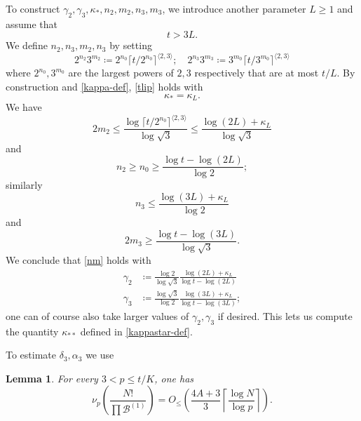 \documentclass[10pt,a4paper,reqno]{amsart}
\numberwithin{equation}{section}
\theoremstyle{plain}
\newtheorem{lemma}[lemma]{Lemma}
\theoremstyle{definition}
\newcommand\tuple{{\mathcal B}}
\begin{document}
To construct $\gamma_2, \gamma_3, \kappa_*, n_2, m_2, n_3, m_3$, we introduce another parameter $L \geq 1$ and assume that
\begin{equation}\label{t-lower}
  t > 3L.
\end{equation}
We define $n_2,n_3,m_2,n_3$ by setting
$$
2^{n_2} 3^{m_2} \coloneqq 2^{n_0} \lceil t/2^{n_0} \rceil^{\langle 2,3 \rangle}; \quad
2^{n_3} 3^{m_3} \coloneqq 3^{m_0} \lceil t/3^{m_0} \rceil^{\langle 2,3 \rangle}$$
where $2^{n_0}, 3^{m_0}$ are the largest powers of $2,3$ respectively that are at most $t/L$.  By construction and \eqref{kappa-def}, \eqref{tlip} holds with
\begin{equation}\label{kappas-eq}
  \kappa_* = \kappa_L.
\end{equation}
We have
$$  2m_2 \leq \frac{\log \lceil t/2^{n_0} \rceil^{\langle 2,3 \rangle}}{\log \sqrt{3}}  \leq \frac{\log(2L) + \kappa_L}{\log \sqrt{3}}
$$
and
$$n_2 \geq n_0 \geq \frac{\log t - \log(2L)}{\log 2};$$
similarly
$$ n_3 \leq \frac{\log(3L)+\kappa_L}{\log 2}$$
and
$$ 2m_3 \geq \frac{\log t - \log(3L)}{\log \sqrt{3}}.$$
We conclude that \eqref{nm} holds with
\begin{equation}\label{gammas-def}
\begin{split}
\gamma_2 &\coloneqq \frac{\log 2}{\log \sqrt{3}} \frac{\log(2L) + \kappa_L}{\log t - \log(2L)} \\
\gamma_3 &\coloneqq \frac{\log \sqrt{3}}{\log 2} \frac{\log(3L) + \kappa_L}{\log t - \log(3L)};
\end{split}
\end{equation}
one can of course also take larger values of $\gamma_2,\gamma_3$ if desired.
This lets us compute the quantity $\kappa_{**}$ defined in \eqref{kappastar-def}.

To estimate $\delta_3, \alpha_3$ we use

\begin{lemma}\label{val-bound} For every $3 < p \leq t/K$, one has
\begin{equation}\label{nup}
  \nu_p\left(\frac{N!}{\prod \tuple^{(1)}}\right) =
O_{\leq}\left(\frac{4A+3}{3} \left\lceil \frac{\log N}{\log p}  \right\rceil\right).
\end{equation}
\end{lemma}
\end{document}
